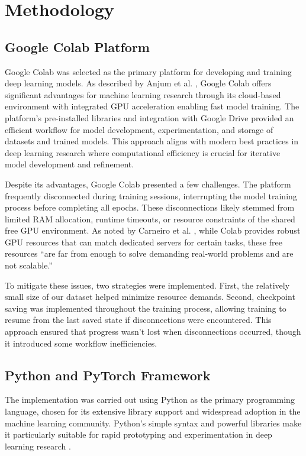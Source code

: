 
\section{Methodology}

\subsection{Google Colab Platform}

Google Colab was selected as the primary platform for developing and training deep learning models. As described by Anjum et al. \citep{anjum2021}, Google Colab offers significant advantages for machine learning research through its cloud-based environment with integrated GPU acceleration enabling fast model training. The platform's pre-installed libraries and integration with Google Drive provided an efficient workflow for model development, experimentation, and storage of datasets and trained models. This approach aligns with modern best practices in deep learning research where computational efficiency is crucial for iterative model development and refinement.

Despite its advantages, Google Colab presented a few challenges. The platform frequently disconnected during training sessions, interrupting the model training process before completing all epochs. These disconnections likely stemmed from limited RAM allocation, runtime timeouts, or resource constraints of the shared free GPU environment. As noted by Carneiro et al. \citep{carneiro2018}, while Colab provides robust GPU resources that can match dedicated servers for certain tasks, these free resources ``are far from enough to solve demanding real-world problems and are not scalable.''

To mitigate these issues, two strategies were implemented. First, the relatively small size of our dataset helped minimize resource demands. Second, checkpoint saving was implemented throughout the training process, allowing training to resume from the last saved state if disconnections were encountered. This approach ensured that progress wasn't lost when disconnections occurred, though it introduced some workflow inefficiencies.

\subsection{Python and PyTorch Framework}

The implementation was carried out using Python as the primary programming language, chosen for its extensive library support and widespread adoption in the machine learning community. Python's simple syntax and powerful libraries make it particularly suitable for rapid prototyping and experimentation in deep learning research \citep{geron2019}.

